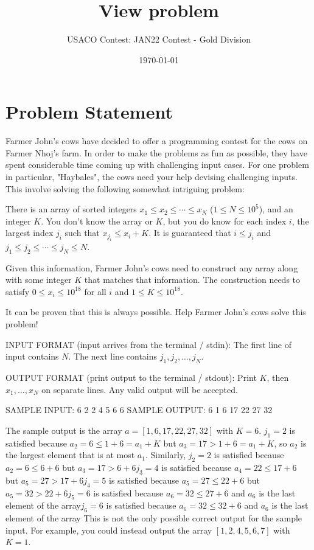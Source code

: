 \documentclass[12pt]{article}
\title{View problem}
\author{USACO Contest: JAN22 Contest - Gold Division}
\date{\today}
\begin{document}
\maketitle

\section*{Problem Statement}

Farmer John's cows have decided to offer a programming contest for the cows on
Farmer Nhoj's farm.  In order to make the problems as fun as possible, they have
spent considerable time coming up with challenging input cases. For one problem
in particular, "Haybales", the cows need your help devising challenging inputs. 
This involve solving the following somewhat intriguing problem:

There is an array of sorted integers $x_1 \leq x_2 \leq \dotsb \leq x_N$
($1 \leq N \leq 10^5$), and an integer $K$. You don't know the array or $K$, but
you do know for each index $i$, the largest index $j_i$ such that
$x_{j_i} \leq x_i + K$. It is guaranteed that $i\le j_i$ and
$j_1\le j_2\le \cdots \le j_N\le N$.

Given this information, Farmer John's cows need to construct any array along 
with some integer $K$ that matches that information. The construction needs to
satisfy $0 \leq x_i \leq 10^{18}$ for all $i$ and $1 \leq K \leq 10^{18}$. 

It can be proven that this is always possible. Help Farmer John's cows solve
this problem!

INPUT FORMAT (input arrives from the terminal / stdin):
The first line of input contains $N$.  The next line contains
$j_1,j_2,\ldots,j_N$.

OUTPUT FORMAT (print output to the terminal / stdout):
Print $K$, then $x_1,\ldots,x_N$ on separate lines. Any valid output will be
accepted.

SAMPLE INPUT:
6
2 2 4 5 6 6
SAMPLE OUTPUT: 
6
1
6
17
22
27
32

The sample output is the array $a = [1, 6, 17, 22, 27, 32]$ with $K = 6$.
$j_1 = 2$ is satisfied because $a_2 = 6 \leq 1 + 6 = a_1 + K$ but
$a_3 = 17 > 1 + 6 = a_1 + K$, so $a_2$ is the largest element that is at most
$a_1$. Similarly,
$j_2 = 2$ is satisfied because $a_2 = 6 \leq 6 + 6$ but
$a_3 = 17 > 6 + 6$$j_3 = 4$ is satisfied because
$a_4 = 22 \leq 17 + 6$ but $a_5 = 27 > 17 + 6$$j_4 = 5$ is satisfied
because $a_5 = 27 \leq 22 + 6$ but $a_5 = 32 > 22 + 6$$j_5 = 6$ is
satisfied because $a_6 = 32 \leq 27 + 6$ and $a_6$ is the last element of the
array$j_6 = 6$ is satisfied because $a_6 = 32 \leq 32 + 6$ and $a_6$
is the last element of the array
This is not the only possible correct output for the sample input. For example,
you could instead output the array $[1, 2, 4, 5, 6, 7]$ with $K = 1$.
\end{document}
